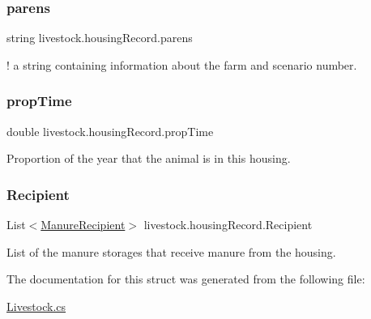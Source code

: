 \subsubsection{\texorpdfstring{parens}{parens}}
{\footnotesize\ttfamily string livestock.\+housing\+Record.\+parens}

! a string containing information about the farm and scenario number. \mbox{\label{structlivestock_1_1housing_record_aefaaa48895680f2d4f90ad4ca14f2c4e}} 
\subsubsection{\texorpdfstring{propTime}{propTime}}
{\footnotesize\ttfamily double livestock.\+housing\+Record.\+prop\+Time}



Proportion of the year that the animal is in this housing. 

\mbox{\label{structlivestock_1_1housing_record_af8ad1589ea0ef0cac608311c445d1ed5}} 
\subsubsection{\texorpdfstring{Recipient}{Recipient}}
{\footnotesize\ttfamily List$<$\mbox{\hyperlink{structlivestock_1_1_manure_recipient}{Manure\+Recipient}}$>$ livestock.\+housing\+Record.\+Recipient}



List of the manure storages that receive manure from the housing. 



The documentation for this struct was generated from the following file\+:\begin{DoxyCompactItemize}
\item 
\mbox{\hyperlink{_livestock_8cs}{Livestock.\+cs}}\end{DoxyCompactItemize}
